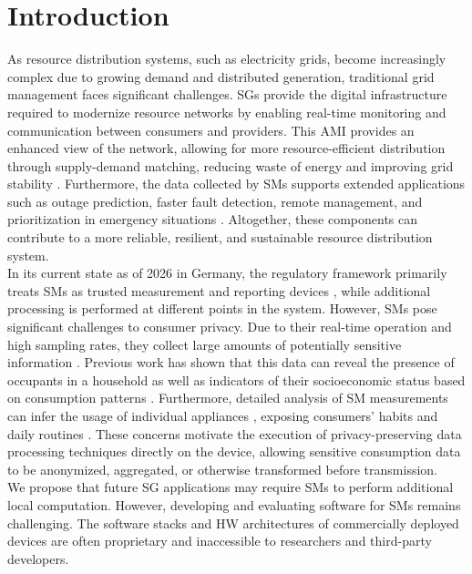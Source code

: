 \documentclass[english]{tudscrartcl}
\begin{document}
	\clearpage

	\section{Introduction}
		\label{sec:intro}
		As resource distribution systems, such as electricity grids, become increasingly complex due to growing demand and distributed generation, traditional grid management faces significant challenges.
		\Acp{SG} provide the digital infrastructure required to modernize resource networks by enabling real-time monitoring and communication between consumers and providers.
		This \ac{AMI} provides an enhanced view of the network, allowing for more resource-efficient distribution through supply-demand matching, reducing waste of energy and improving grid stability \cite{en15196984}.
		Furthermore, the data collected by \acp{SM} supports extended applications such as outage prediction, faster fault detection, remote management, and prioritization in emergency situations \cite{7379940}.
		Altogether, these components can contribute to a more reliable, resilient, and sustainable resource distribution system.
		\\
		In its current state as of 2026 in Germany, the regulatory framework primarily treats \acp{SM} as trusted measurement and reporting devices \cite{Msbg52, Msbg55}, while additional processing is performed at different points in the system.
		However, \acp{SM} pose significant challenges to consumer privacy.
		Due to their real-time operation and high sampling rates, they collect large amounts of potentially sensitive information \cite{7959167}.
		Previous work has shown that this data can reveal the presence of occupants in a household as well as indicators of their socioeconomic status based on consumption patterns \cite{7959167}.
		Furthermore, detailed analysis of \ac{SM} measurements can infer the usage of individual appliances \cite{20101011}, exposing consumers' habits and daily routines \cite{20101011}.
		These concerns motivate the execution of privacy-preserving data processing techniques directly on the device, allowing sensitive consumption data to be anonymized, aggregated, or otherwise transformed before transmission.
		\\
		We propose that future \ac{SG} applications may require \acp{SM} to perform additional local computation.
		However, developing and evaluating software for \acp{SM} remains challenging.
		The software stacks and \ac{HW} architectures of commercially deployed devices are often proprietary and inaccessible to researchers and third-party developers.
\end{document}
